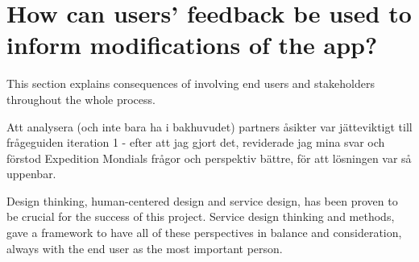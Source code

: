 
\section{How can users' feedback be used to inform modifications of the app?}

  This section explains consequences of involving end users and stakeholders throughout the whole process.

  Att analysera (och inte bara ha i bakhuvudet) partners åsikter var jätteviktigt till frågeguiden iteration 1 - efter att jag gjort det, reviderade jag mina svar och förstod Expedition Mondials frågor och perspektiv bättre, för att lösningen var så uppenbar. 

  Design thinking, human-centered design and service design, has been proven to be crucial for the success of this project. Service design thinking and methods, gave a framework to have all of these perspectives in balance and consideration, always with the end user as the most important person.

